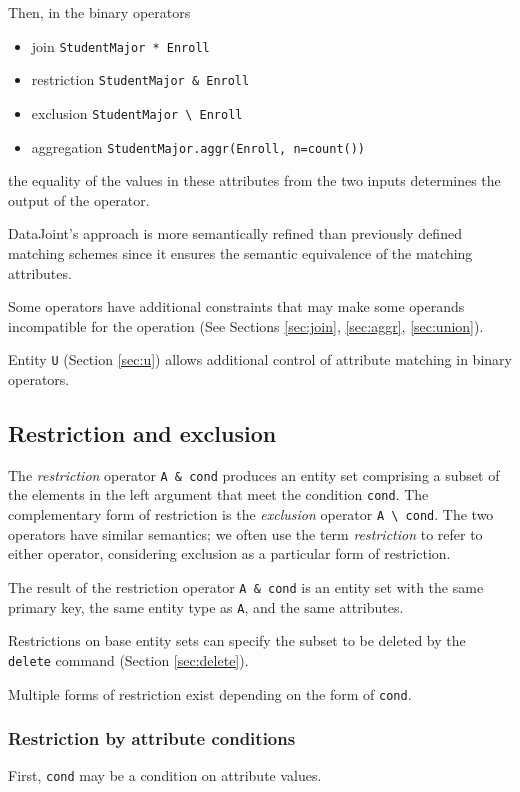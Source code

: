 \documentclass[letter,10pt]{article}
\newcommand{\datajoint}{DataJoint\xspace}
\begin{document}
Then, in the binary operators 
\begin{itemize}
\item join \lstinline$StudentMajor * Enroll$ 
\item restriction \lstinline$StudentMajor & Enroll$ 
\item exclusion \lstinline$StudentMajor \ Enroll$ 
\item aggregation \lstinline$StudentMajor.aggr(Enroll, n=count())$ 
\end{itemize}
 the equality of the values in these attributes from the two inputs determines the output of the operator.

\datajoint's approach is more semantically refined than previously defined matching schemes since it ensures the semantic equivalence of the matching attributes.

Some operators have additional constraints that may make some operands incompatible for the operation (See Sections \ref{sec:join}, \ref{sec:aggr}, \ref{sec:union}).

Entity \lstinline$U$ (Section \ref{sec:u}) allows additional control of attribute matching in binary operators.

\subsection{Restriction and exclusion}\label{sec:restrict}
The \emph{restriction} operator \lstinline$A & cond$ produces an entity set comprising a subset of the elements in the left argument that meet the condition \lstinline$cond$. 
The complementary form of restriction is the \emph{exclusion} operator \lstinline$A \ cond$.
The two operators have similar semantics; we often use the term \emph{restriction} to refer to either  operator, considering exclusion as a particular form of restriction.

The result of the restriction operator \lstinline$A & cond$ is an entity set with the same primary key, the same entity type as \lstinline$A$, and the same attributes.

Restrictions on base entity sets can specify the subset to be deleted by the \lstinline$delete$ command (Section \ref{sec:delete}).

Multiple forms of restriction exist depending on the form of \lstinline$cond$.

\subsubsection{Restriction by attribute conditions}
First, \lstinline$cond$ may be a condition on attribute values.  
\end{document}

